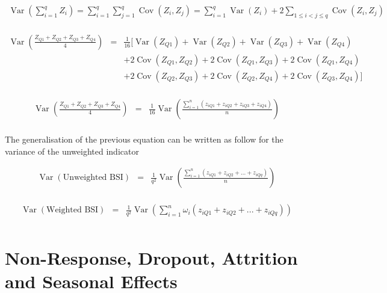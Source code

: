 \documentclass[12pt,a4paper,oneside]{book}
\DeclareMathOperator{\Var}{Var}
\DeclareMathOperator{\Cov}{Cov}
\begin{document}
\begin{eqnarray}
\Var \left(\sum_{i=1}^{q} Z_{i}\right) = \sum_{i=1}^{q} \sum_{j=1}^{q} \Cov\left(Z_{i}, Z_{j}\right)
= \sum_{i=1}^{q} \Var\left(Z_{i}\right)+2 \sum_{1 \leq i<j \leq q} \Cov\left(Z_{i}, Z_{j}\right) \\ \nonumber
\end{eqnarray} 



\begin{eqnarray}
    \Var \left(\frac{Z_{Q1} + Z_{Q2} + Z_{Q3} + Z_{Q4}}{4} \right) 
    &=& \frac{1}{16} \Big[ \Var(Z_{Q1}) + \Var(Z_{Q2}) + \Var(Z_{Q3}) + \Var(Z_{Q4}) \nonumber \\
    && + 2 \Cov (Z_{Q1},Z_{Q2}) + 2 \Cov (Z_{Q1},Z_{Q3}) + 2 \Cov (Z_{Q1},Z_{Q4}) \nonumber \\
    &&  + 2 \Cov (Z_{Q2},Z_{Q3}) + 2 \Cov (Z_{Q2},Z_{Q4}) + 2 \Cov (Z_{Q3},Z_{Q4}) \Big] \nonumber \\
\end{eqnarray}



\begin{eqnarray}
    \Var \left(\frac{Z_{Q1} + Z_{Q2} + Z_{Q3} + Z_{Q4}}{4} \right) 
    &=& \frac{1}{16} \Var \left(\frac{\sum_{i=1}^n \left(z_{i Q1} + z_{i Q2} + z_{i Q3} + z_{i Q4} \right)}{n} \right) \nonumber \\
\end{eqnarray}

The generalisation of the previous equation can be written as follow for the variance of the unweighted indicator

\begin{eqnarray}
    \Var \left(\text{Unweighted BSI} \right) 
    &=& \frac{1}{q^2} \Var \left(\frac{\sum_{i=1}^n \left( z_{i Q1} + z_{i Q2} + ... + z_{i Qq} \right)}{n} \right) \nonumber \\
\end{eqnarray}

\begin{eqnarray}
    \Var \left(\text{Weighted BSI} \right) 
    &=& \frac{1}{q^2} \Var \left( \sum_{i=1}^n \omega_i \left(z_{i Q1} + z_{i Q2} + ... + z_{i Qq} \right) \right) \nonumber \\
\end{eqnarray}




\chapter{Non-Response, Dropout, Attrition and Seasonal Effects}
\label{chap:nonresponse dropout}
\end{document}
